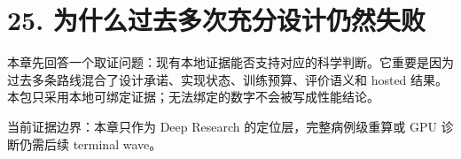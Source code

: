 \section{25. 为什么过去多次充分设计仍然失败}

本章先回答一个取证问题：现有本地证据能否支持对应的科学判断。它重要是因为过去多条路线混合了设计承诺、实现状态、训练预算、评价语义和 hosted 结果。本包只采用本地可绑定证据；无法绑定的数字不会被写成性能结论。



当前证据边界：本章只作为 Deep Research 的定位层，完整病例级重算或 GPU 诊断仍需后续 terminal wave。



\clearpage